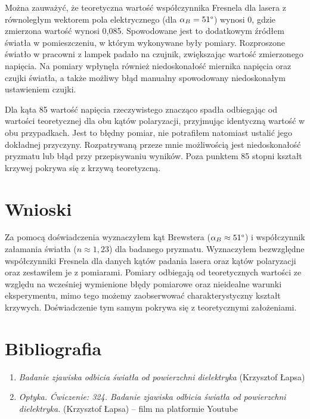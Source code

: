 \documentclass[polish, a4paper]{article}
\begin{document}
Można zauważyć, że teoretyczna wartość współczynnika Fresnela dla lasera z równoległym wektorem pola elektrycznego (dla $\alpha_B = 51\degree$) wynosi 0, gdzie zmierzona wartość wynosi 0,085. Spowodowane jest to dodatkowym źródłem światła w pomieszczeniu, w którym wykonywane były pomiary. Rozproszone światło w pracowni z lampek padało na czujnik, zwiększając wartość zmierzonego napięcia. Na pomiary wpłynęła również niedoskonałość miernika napięcia oraz czujki światła, a także możliwy błąd manualny spowodowany niedoskonałym ustawieniem czujki. 

Dla kąta 85\textdegree \; wartość napięcia rzeczywistego znacząco spadła odbiegając od wartości teoretycznej dla obu kątów polaryzacji, przyjmując identyczną wartość w obu przypadkach. Jest to błędny pomiar, nie potrafiłem natomiast ustalić jego dokładnej przyczyny. Rozpatrywaną przeze mnie możliwością jest niedoskonałość pryzmatu lub błąd przy przepisywaniu wyników. Poza punktem 85 stopni kształt krzywej pokrywa się z krzywą teoretyzcną. 
\section{Wnioski}

Za pomocą doświadczenia wyznaczyłem kąt Brewstera ($\alpha_B \approx 51\degree$) i współczynnik załamania światła ($n \approx 1,23$) dla badanego pryzmatu. Wyznaczyłem bezwzględne współczynniki Fresnela dla danych kątów padania lasera oraz kątów polaryzacji oraz zestawiłem je z pomiarami. Pomiary odbiegają od teoretycznych wartości ze względu na wcześniej wymienione błędy pomiarowe oraz nieidealne warunki eksperymentu, mimo tego możemy zaobserwować charakterystyczny kształt krzywych. Doświadczenie tym samym pokrywa się z teoretycznymi założeniami.


\section{Bibliografia}

\begin{enumerate}
    \item {\emph{Badanie zjawiska odbicia światła od powierzchni
dielektryka} (Krzysztof Łapsa)}
    \item {\emph{Optyka. Ćwiczenie: 324. Badanie zjawiska odbicia światła od powierzchni dielektryka.} (Krzysztof Łapsa) – film na platformie Youtube}
\end{enumerate}
\end{document}
